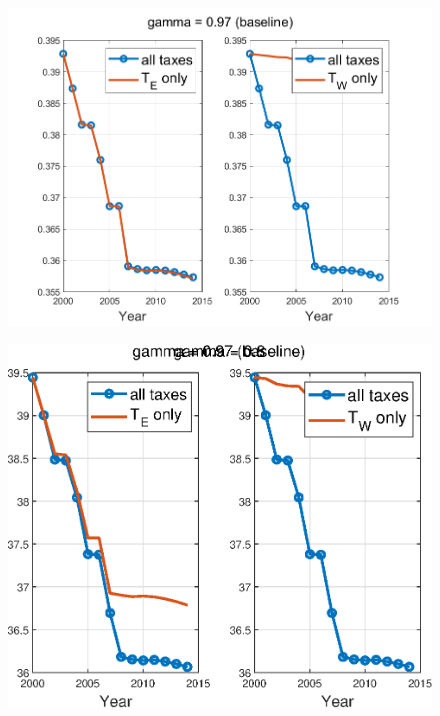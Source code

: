 \documentclass[12pt]{article}
\begin{document}
\begin{figure}[htbp]
\centering
\includegraphics[scale=0.8]{alltax_vs_te_gamma097.png}
\end{figure}

\begin{figure}[htbp]
\centering
\includegraphics[scale=0.8]{alltax_vs_te_gamma08.eps}
\end{figure}
\end{document}

